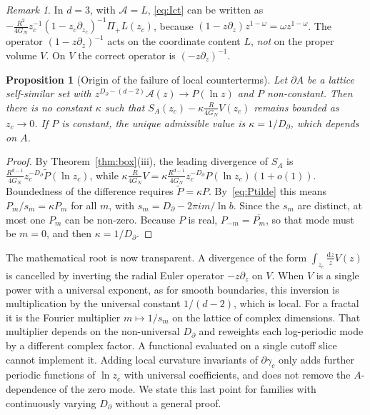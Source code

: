 \documentclass[11pt]{article}
\newtheorem{proposition}{Proposition}[section]
\theoremstyle{definition}\newtheorem{definition}{Definition}[section]
\theoremstyle{remark}\newtheorem*{remark}{Remark}
\newcommand{\cA}{\mathcal{A}}
\newcommand{\dd}{\mathrm{d}}
\newcommand{\GN}{G_N}
\begin{document}
\begin{remark}
In $d=3$, with $\cA=L$, \eqref{eq:Ict} can be written as
$-\frac{R^2}{4\GN}z_c^{-1}(1-z_c\partial_{z_c})^{-1}\Pi_+L(z_c)$, because
$(1-z\partial_z)z^{1-\omega}=\omega z^{1-\omega}$. The operator $(1-z\partial_z)^{-1}$ acts on the coordinate
content $L$, \emph{not} on the proper volume $V$. On $V$ the correct operator is $(-z\partial_z)^{-1}$.
\end{remark}

\begin{proposition}[Origin of the failure of local counterterms]
\label{prop:nolocal}
Let $\partial A$ be a lattice self-similar set with $z^{D_\partial-(d-2)}\cA(z)\to P(\ln z)$ and $P$
non-constant. Then there is no constant $\kappa$ such that $S_A(z_c)-\kappa\frac{R}{4\GN}V(z_c)$ remains
bounded as $z_c\to0$. If $P$ is constant, the unique admissible value is $\kappa=1/D_\partial$, which depends on
$A$.
\end{proposition}
\begin{proof}
By Theorem~\ref{thm:box}(iii), the leading divergence of $S_A$ is
$\frac{R^{d-1}}{4\GN}z_c^{-D_\partial}\tilde P(\ln z_c)$, while
$\kappa\frac{R}{4\GN}V=\kappa\frac{R^{d-1}}{4\GN}z_c^{-D_\partial}P(\ln z_c)(1+o(1))$. Boundedness of the difference
requires $\tilde P=\kappa P$. By~\eqref{eq:Ptilde} this means $P_m/s_m=\kappa P_m$ for all $m$, with
$s_m=D_\partial-2\pi im/\ln b$. Since the $s_m$ are distinct, at most one $P_m$ can be non-zero. Because $P$
is real, $P_{-m}=\overline{P_m}$, so that mode must be $m=0$, and then $\kappa=1/D_\partial$.
\end{proof}
The mathematical root is now transparent. A divergence of the form $\int_{z_c}\frac{\dd z}{z}V(z)$ is
cancelled by inverting the radial Euler operator $-z\partial_z$ on $V$. When $V$ is a single power with a
universal exponent, as for smooth boundaries, this inversion is multiplication by the universal constant
$1/(d-2)$, which is local. For a fractal it is the Fourier multiplier $m\mapsto1/s_m$ on the lattice of
complex dimensions. That multiplier depends on the non-universal $D_\partial$ and reweights each log-periodic mode
by a different complex factor. A functional evaluated on a single cutoff slice cannot implement it. Adding local curvature invariants of $\partial\gamma_c$ only adds further periodic functions of
$\ln z_c$ with universal coefficients, and does not remove the $A$-dependence of the zero mode. We state this
last point for families with continuously varying $D_\partial$ without a general proof.
\end{document}
